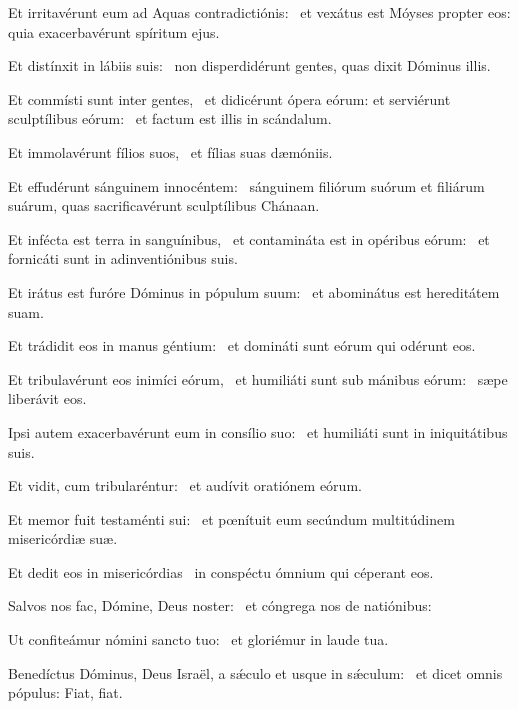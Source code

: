 
\item Et irritavérunt eum ad Aquas contradictiónis:~\psstar{} et vexátus est Móyses propter eos: quia exacerbavérunt spíritum ejus.

\item Et distínxit in lábiis suis:~\psstar{} non disperdidérunt gentes, quas dixit Dóminus illis.

\item Et commísti sunt inter gentes,~\pscross{} et didicérunt ópera eórum: et serviérunt sculptílibus eórum:~\psstar{} et factum est illis in scándalum.

\item Et immolavérunt fílios suos,~\psstar{} et fílias suas dæmóniis.

\item Et effudérunt sánguinem innocéntem:~\psstar{} sánguinem filiórum suórum et filiárum suárum, quas sacrificavérunt sculptílibus Chánaan.

\item Et infécta est terra in sanguínibus,~\pscross{} et contamináta est in opéribus eórum:~\psstar{} et fornicáti sunt in adinventiónibus suis.

\item Et irátus est furóre Dóminus in pópulum suum:~\psstar{} et abominátus est hereditátem suam.

\item Et trádidit eos in manus géntium:~\psstar{} et domináti sunt eórum qui odérunt eos.

\item Et tribulavérunt eos inimíci eórum,~\pscross{} et humiliáti sunt sub mánibus eórum:~\psstar{} sæpe liberávit eos.

\item Ipsi autem exacerbavérunt eum in consílio suo:~\psstar{} et humiliáti sunt in iniquitátibus suis.

\item Et vidit, cum tribularéntur:~\psstar{} et audívit oratiónem eórum.

\item Et memor fuit testaménti sui:~\psstar{} et pœnítuit eum secúndum multitúdinem misericórdiæ suæ.

\item Et dedit eos in misericórdias~\psstar{} in conspéctu ómnium qui céperant eos.

\item Salvos nos fac, Dómine, Deus noster:~\psstar{} et cóngrega nos de natiónibus:

\item Ut confiteámur nómini sancto tuo:~\psstar{} et gloriémur in laude tua.

\item Benedíctus Dóminus, Deus Israël, a sǽculo et usque in sǽculum:~\psstar{} et dicet omnis pópulus: Fiat, fiat.